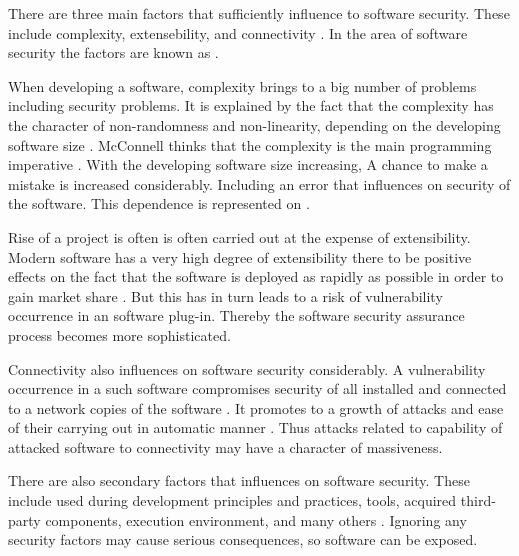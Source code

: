 %
There are three main factors that sufficiently influence to software security. 
%
These include complexity, extensebility, and connectivity . 
%
In the area of software security the factors are known as  . 

%
When developing a software, complexity brings to a big number of problems including security problems. 
%
It is explained by the fact that the complexity has the character of non-randomness and non-linearity, depending on the developing software size . 
%
McConnell thinks that the complexity is the main programming imperative . 
%
With the developing software size increasing, A chance to make a mistake is increased considerably. 
%
Including an error that influences on security of the software. 
%
This dependence is represented on . 


%
Rise of a project is often is often carried out at the expense of extensibility. 
%
Modern software has a very high degree of extensibility there to be positive effects on the fact that the software is deployed as rapidly as possible in order to gain market share . 
%
But this has in turn leads to a risk of vulnerability occurrence in an software plug-in. 
%
Thereby the software security assurance process becomes more sophisticated. 

%
Connectivity also influences on software security considerably. 
%
A vulnerability occurrence in a such software compromises security of all installed and connected to a network copies of the software  . 
%
It promotes to a growth of attacks and ease of their carrying out in automatic manner . 
%
Thus attacks related to capability of attacked software to connectivity may have a character of massiveness. 

%
There are also secondary factors that influences on software security. 
%
These include used during development principles and practices, tools, acquired third-party components, execution environment, and many others . 
%
Ignoring any security factors may cause serious consequences, so software can be exposed. 